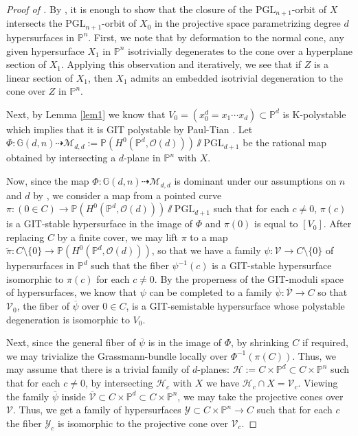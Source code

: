 \documentclass[11pt,reqno]{amsart}
\renewcommand{\P}{\mathbb{P}}
\newcommand{\cH}{\mathcal{H}}
\newcommand{\cM}{\mathcal{M}}
\newcommand{\cO}{\mathcal{O}}
\newcommand{\cV}{\mathcal{V}}
\newcommand{\cY}{\mathcal{Y}}
\newcommand{\bP}{\mathbb{P}}
\newcommand{\bG}{\mathbb{G}}
\newcommand{\PP}{\mathbb{P}}
\newcommand{\PGL}{\mathrm{PGL}}
\numberwithin{equation}{section}
\theoremstyle{definition}
\begin{document}
\begin{proof}[Proof of ]
    By , it is enough to show that the closure of the $\PGL_{n+1}$-orbit of $X$ intersects the $\PGL_{n+1}$-orbit of $X_0$ in the projective space parametrizing degree $d$ hypersurfaces in $\PP^n$. First, we note that by deformation to the normal cone, any given hypersurface $X_1$ in $\PP^n$ isotrivially degenerates to the cone over a hyperplane section of $X_1$. Applying this observation and  iteratively, we see that if $Z$ is a linear section of $X_1$, then $X_1$ admits an embedded isotrivial degeneration to the cone over $Z$ in $\PP^n$.

   Next, by Lemma \ref{lem1} we know that $V_0 = (x_0^d = x_1\cdots x_d)\subset \bP^d$ is K-polystable which implies that it is GIT polystable by Paul-Tian \cite{PT06}. Let $\Phi:\bG(d,n)\dashrightarrow \cM_{d,d}  := \bP(H^0(\bP^d, \cO(d)))\sslash \PGL_{d+1}$ be the rational map obtained by intersecting a $d$-plane in $\P^n $ with $X$. 
   
   Now, since the map $\Phi:\bG(d,n)\dashrightarrow \cM_{d,d}$ is dominant under our assumptions on $n$ and $d$ by \cite{Sta06}, we consider a map from a pointed curve $\pi: (0 \in C) \to \bP(H^0(\bP^d,  \cO(d)))\sslash \PGL_{d+1}$ such that for each $c \neq 0$, $\pi(c)$ is a GIT-stable hypersurface in the image of $
   \Phi$ and $\pi(0)$ is equal to $[V_0]$. After replacing $C$ by a finite cover, we may lift $\pi$ to a map $\tilde{\pi}: C \setminus \{0\} \to \bP(H^0(\bP^d,  \cO(d)))$, so that we have a family $\psi: \cV \to C \setminus \{0\} $ of hypersurfaces in $\P ^d$ such that the fiber $\psi^{-1}(c)$ is a GIT-stable hypersurface isomorphic to $\pi(c)$ for each $c \neq 0$. By the properness of the GIT-moduli space of hypersurfaces, we know that $\psi$ can be completed to a family $\overline{\psi}: \overline{\cV} \to C $ so that $\cV_0$, the fiber of $\overline{\psi}$ over $0 \in C $, is a GIT-semistable hypersurface whose polystable degeneration is isomorphic to $V_0$.

   
   Next, since the general fiber of $\overline{\psi}$ is in the image of $\Phi$, by shrinking $C$ if required, we may trivialize the Grassmann-bundle locally over $\Phi^{-1} (\pi(C))$. Thus, we may assume that there is a trivial family of $d$-planes: $ \cH := C  \times \P^d \subset C \times \P^n$ such that for each $c \neq 0$, by intersecting $\cH_c$ with $X$ we have $ \cH_{c} \cap X = \cV_c $. Viewing the family $\overline{\psi}$ inside $\overline{\cV} \subset C \times \P^d \subset C \times \P^n $, we may take the projective cones over $\cV$. Thus, we get a family of hypersurfaces $\cY \subset C \times \PP^n  \to C$ such that for each $c$ the fiber $\cY_c$ is isomorphic to the projective cone over $\cV_c$.
   

\end{proof}
\end{document}
